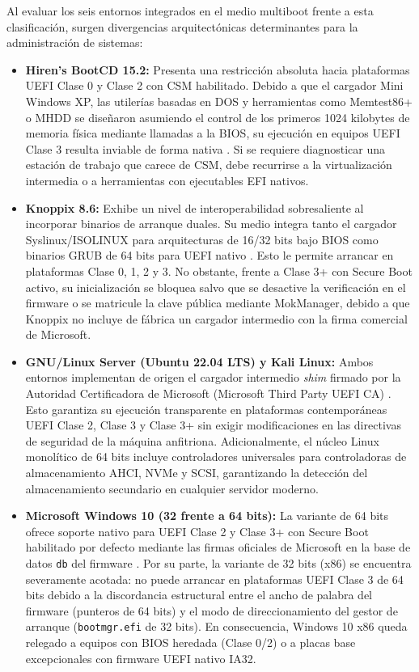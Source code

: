 \documentclass[12pt]{article}
\begin{document}
Al evaluar los seis entornos integrados en el medio multiboot frente a esta clasificación, surgen divergencias arquitectónicas determinantes para la administración de sistemas:

\begin{itemize}[noitemsep, topsep=2pt]
    \item \textbf{Hiren's BootCD 15.2:} Presenta una restricción absoluta hacia plataformas UEFI Clase 0 y Clase 2 con CSM habilitado. Debido a que el cargador Mini Windows XP, las utilerías basadas en DOS y herramientas como Memtest86+ o MHDD se diseñaron asumiendo el control de los primeros 1024 kilobytes de memoria física mediante llamadas a la BIOS, su ejecución en equipos UEFI Clase 3 resulta inviable de forma nativa \parencite{hiren2012bootcd}. Si se requiere diagnosticar una estación de trabajo que carece de CSM, debe recurrirse a la virtualización intermedia o a herramientas con ejecutables EFI nativos.
    \item \textbf{Knoppix 8.6:} Exhibe un nivel de interoperabilidad sobresaliente al incorporar binarios de arranque duales. Su medio integra tanto el cargador Syslinux/ISOLINUX para arquitecturas de 16/32 bits bajo BIOS como binarios GRUB de 64 bits para UEFI nativo \parencite{knoppix2019release}. Esto le permite arrancar en plataformas Clase 0, 1, 2 y 3. No obstante, frente a Clase 3+ con Secure Boot activo, su inicialización se bloquea salvo que se desactive la verificación en el firmware o se matricule la clave pública mediante MokManager, debido a que Knoppix no incluye de fábrica un cargador intermedio con la firma comercial de Microsoft.
    \item \textbf{GNU/Linux Server (Ubuntu 22.04 LTS) y Kali Linux:} Ambos entornos implementan de origen el cargador intermedio \textit{shim} firmado por la Autoridad Certificadora de Microsoft (Microsoft Third Party UEFI CA) \parencite{canonical2024server, offensive2024kali}. Esto garantiza su ejecución transparente en plataformas contemporáneas UEFI Clase 2, Clase 3 y Clase 3+ sin exigir modificaciones en las directivas de seguridad de la máquina anfitriona. Adicionalmente, el núcleo Linux monolítico de 64 bits incluye controladores universales para controladoras de almacenamiento AHCI, NVMe y SCSI, garantizando la detección del almacenamiento secundario en cualquier servidor moderno.
    \item \textbf{Microsoft Windows 10 (32 frente a 64 bits):} La variante de 64 bits ofrece soporte nativo para UEFI Clase 2 y Clase 3+ con Secure Boot habilitado por defecto mediante las firmas oficiales de Microsoft en la base de datos \texttt{db} del firmware \parencite{microsoft2024win10}. Por su parte, la variante de 32 bits (x86) se encuentra severamente acotada: no puede arrancar en plataformas UEFI Clase 3 de 64 bits debido a la discordancia estructural entre el ancho de palabra del firmware (punteros de 64 bits) y el modo de direccionamiento del gestor de arranque (\texttt{bootmgr.efi} de 32 bits). En consecuencia, Windows 10 x86 queda relegado a equipos con BIOS heredada (Clase 0/2) o a placas base excepcionales con firmware UEFI nativo IA32.
\end{itemize}
\end{document}
